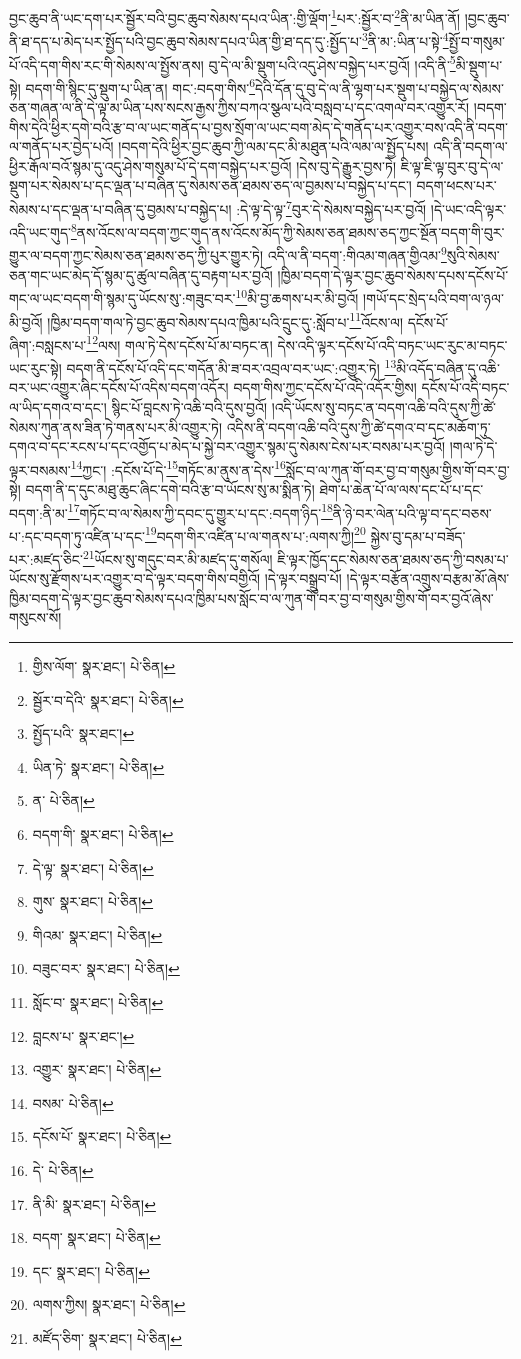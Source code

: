 བྱང་ཆུབ་ནི་ཡང་དག་པར་སྦྱོར་བའི་བྱང་ཆུབ་སེམས་དཔའ་ཡིན་:གྱི་ལྡོག་\footnote{གྱིས་ལོག་  སྣར་ཐང་།  པེ་ཅིན། }པར་:སྦྱོར་བ་\footnote{སྦྱོར་བ་དེའི་  སྣར་ཐང་།  པེ་ཅིན། }ནི་མ་ཡིན་ནོ། །བྱང་ཆུབ་ནི་ཐ་དད་པ་མེད་པར་སྤྱོད་པའི་བྱང་ཆུབ་སེམས་དཔའ་ཡིན་གྱི་ཐ་དད་དུ་:སྤྱོད་པ་\footnote{སྤྱོད་པའི་  སྣར་ཐང་། }ནི་མ་:ཡིན་པ་སྟེ་\footnote{ཡིན་ཏེ་  སྣར་ཐང་།  པེ་ཅིན། }སྤྱོ་བ་གསུམ་པོ་འདི་དག་གིས་རང་གི་སེམས་ལ་སྤྱོས་ནས། བུ་དེ་ལ་མི་སྡུག་པའི་འདུ་ཤེས་བསྐྱེད་པར་བྱའོ། །འདི་ནི་\footnote{ན་  པེ་ཅིན། }མི་སྡུག་པ་སྟེ། བདག་གི་སྙིང་དུ་སྡུག་པ་ཡིན་ན། གང་:བདག་གིས་\footnote{བདག་གི་  སྣར་ཐང་།  པེ་ཅིན། }དེའི་དོན་དུ་བུ་དེ་ལ་ནི་ལྷག་པར་སྡུག་པ་བསྐྱེད་ལ་སེམས་ཅན་གཞན་ལ་ནི་དེ་ལྟ་མ་ཡིན་པས་སངས་རྒྱས་ཀྱིས་བཀའ་སྩལ་པའི་བསླབ་པ་དང་འགལ་བར་འགྱུར་རོ། །བདག་གིས་དེའི་ཕྱིར་དགེ་བའི་རྩ་བ་ལ་ཡང་གནོད་པ་བྱས་སྲོག་ལ་ཡང་བག་མེད་དེ་གནོད་པར་འགྱུར་བས་འདི་ནི་བདག་ལ་གནོད་པར་བྱེད་པའོ། །བདག་དེའི་ཕྱིར་བྱང་ཆུབ་ཀྱི་ལམ་དང་མི་མཐུན་པའི་ལམ་ལ་སྤྱོད་པས། འདི་ནི་བདག་ལ་ཕྱིར་རྒོལ་བའོ་སྙམ་དུ་འདུ་ཤེས་གསུམ་པོ་དེ་དག་བསྐྱེད་པར་བྱའོ། །དེས་བུ་དེ་རྒྱུར་བྱས་ཏེ། ཇི་ལྟ་ཇི་ལྟ་བུར་བུ་དེ་ལ་སྡུག་པར་སེམས་པ་དང་ལྡན་པ་བཞིན་དུ་སེམས་ཅན་ཐམས་ཅད་ལ་བྱམས་པ་བསྐྱེད་པ་དང་། བདག་ཕངས་པར་སེམས་པ་དང་ལྡན་པ་བཞིན་དུ་བྱམས་པ་བསྐྱེད་པ། :དེ་ལྟ་དེ་ལྟ་\footnote{དེ་ལྟ་  སྣར་ཐང་།  པེ་ཅིན། }བུར་དེ་སེམས་བསྐྱེད་པར་བྱའོ། །དེ་ཡང་འདི་ལྟར་འདི་ཡང་གུད་\footnote{གུས་  སྣར་ཐང་།  པེ་ཅིན། }ནས་འོངས་ལ་བདག་ཀྱང་གུད་ནས་འོངས་མོད་ཀྱི་སེམས་ཅན་ཐམས་ཅད་ཀྱང་སྔོན་བདག་གི་བུར་གྱུར་ལ་བདག་ཀྱང་སེམས་ཅན་ཐམས་ཅད་ཀྱི་པུར་གྱུར་ཏེ། འདི་ལ་ནི་བདག་:གིའམ་གཞན་གྱིའམ་\footnote{གིའམ་  སྣར་ཐང་།  པེ་ཅིན། }སུའི་སེམས་ཅན་གང་ཡང་མེད་དོ་སྙམ་དུ་ཚུལ་བཞིན་དུ་བརྟག་པར་བྱའོ། །ཁྱིམ་བདག་དེ་ལྟར་བྱང་ཆུབ་སེམས་དཔས་དངོས་པོ་གང་ལ་ཡང་བདག་གི་སྙམ་དུ་ཡོངས་སུ་:གཟུང་བར་\footnote{བཟུང་བར་  སྣར་ཐང་།  པེ་ཅིན། }མི་བྱ་ཆགས་པར་མི་བྱའོ། །གཡོ་དང་སྲེད་པའི་བག་ལ་ཉལ་མི་བྱའོ། །ཁྱིམ་བདག་གལ་ཏེ་བྱང་ཆུབ་སེམས་དཔའ་ཁྱིམ་པའི་དྲུང་དུ་:སློབ་པ་\footnote{སློང་བ་  སྣར་ཐང་།  པེ་ཅིན། }འོངས་ལ། དངོས་པོ་ཞིག་:བསླངས་པ་\footnote{བླངས་པ་  སྣར་ཐང་། }ལས། གལ་ཏེ་དེས་དངོས་པོ་མ་བཏང་ན། དེས་འདི་ལྟར་དངོས་པོ་འདི་བཏང་ཡང་རུང་མ་བཏང་ཡང་རུང་སྟེ། བདག་ནི་དངོས་པོ་འདི་དང་གདོན་མི་ཟ་བར་འབྲལ་བར་ཡང་:འགྱུར་ཏེ། \footnote{འགྱུར་  སྣར་ཐང་།  པེ་ཅིན། }མི་འདོད་བཞིན་དུ་འཆི་བར་ཡང་འགྱུར་ཞིང་དངོས་པོ་འདིས་བདག་འདོར། བདག་གིས་ཀྱང་དངོས་པོ་འདི་འདོར་གྱིས། དངོས་པོ་འདི་བཏང་ལ་ཡིད་དགའ་བ་དང་། སྙིང་པོ་བླངས་ཏེ་འཆི་བའི་དུས་བྱའོ། །འདི་ཡོངས་སུ་བཏང་ན་བདག་འཆི་བའི་དུས་ཀྱི་ཚེ་སེམས་ཀུན་ནས་ཟིན་ཏེ་གནས་པར་མི་འགྱུར་ཏེ། འདིས་ནི་བདག་འཆི་བའི་དུས་ཀྱི་ཚེ་དགའ་བ་དང་མཆོག་ཏུ་དགའ་བ་དང་རངས་པ་དང་འགྱོད་པ་མེད་པ་སྐྱེ་བར་འགྱུར་སྙམ་དུ་སེམས་ངེས་པར་བསམ་པར་བྱའོ། །གལ་ཏེ་དེ་ལྟར་བསམས་\footnote{བསམ་  པེ་ཅིན། }ཀྱང་། :དངོས་པོ་དེ་\footnote{དངོས་པོ་  སྣར་ཐང་།  པེ་ཅིན། }གཏོང་མ་ནུས་ན་དེས་\footnote{དེ་  པེ་ཅིན། }སློང་བ་ལ་ཀུན་གོ་བར་བྱ་བ་གསུམ་གྱིས་གོ་བར་བྱ་སྟེ། བདག་ནི་ད་དུང་མཐུ་ཆུང་ཞིང་དགེ་བའི་རྩ་བ་ཡོངས་སུ་མ་སྨིན་ཏེ། ཐེག་པ་ཆེན་པོ་ལ་ལས་དང་པོ་པ་དང་བདག་:ནི་མ་\footnote{ནི་མི་  སྣར་ཐང་།  པེ་ཅིན། }གཏོང་བ་ལ་སེམས་ཀྱི་དབང་དུ་གྱུར་པ་དང་:བདག་ཉིད་\footnote{བདག་  སྣར་ཐང་།  པེ་ཅིན། }ནི་ཉེ་བར་ལེན་པའི་ལྟ་བ་དང་བཅས་པ་:དང་བདག་ཏུ་འཛིན་པ་དང་\footnote{དང་  སྣར་ཐང་།  པེ་ཅིན། }བདག་གིར་འཛིན་པ་ལ་གནས་པ་:ལགས་ཀྱི།\footnote{ལགས་ཀྱིས།  སྣར་ཐང་།  པེ་ཅིན། } སྐྱེས་བུ་དམ་པ་བཟོད་པར་:མཛད་ཅིང་\footnote{མཛོད་ཅིག་  སྣར་ཐང་།  པེ་ཅིན། }ཡོངས་སུ་གདུང་བར་མི་མཛད་དུ་གསོལ། ཇི་ལྟར་ཁྱོད་དང་སེམས་ཅན་ཐམས་ཅད་ཀྱི་བསམ་པ་ཡོངས་སུ་རྫོགས་པར་འགྱུར་བ་དེ་ལྟར་བདག་གིས་བགྱིའོ། །དེ་ལྟར་བསྒྲུབ་པོ། །དེ་ལྟར་བརྩོན་འགྲུས་བརྩམ་མོ་ཞེས་ཁྱིམ་བདག་དེ་ལྟར་བྱང་ཆུབ་སེམས་དཔའ་ཁྱིམ་པས་སློང་བ་ལ་ཀུན་གོ་བར་བྱ་བ་གསུམ་གྱིས་གོ་བར་བྱའོ་ཞེས་གསུངས་སོ། 